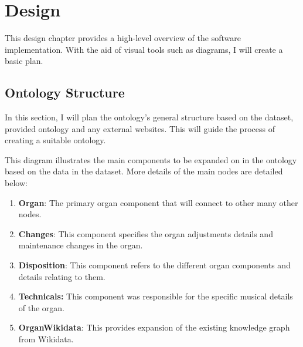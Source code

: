 \chapter{Design}
This design chapter provides a high-level overview of the software implementation. With the aid of visual tools such as diagrams, I will create a basic plan. 

\section{Ontology Structure}
In this section, I will plan the ontology's general structure based on the dataset, provided ontology and any external websites. This will guide the process of creating a suitable ontology.  

\bigskip
\begin{center}
\end{center}

This diagram illustrates the main components to be expanded on in the ontology based on the data in the dataset. More details of the main nodes are detailed below:

\begin{enumerate}
    \item \textbf{Organ}: The primary organ component that will connect to other many other nodes.
    \item \textbf{Changes}: This component specifies the organ adjustments details and maintenance changes in the organ.
    \item \textbf{Disposition}: This component refers to the different organ components and details relating to them.
    \item \textbf{Technicals:} This component was responsible for the specific musical details of the organ. 
    \item \textbf{OrganWikidata}: This provides expansion of the existing knowledge graph from Wikidata.
\end{enumerate}


